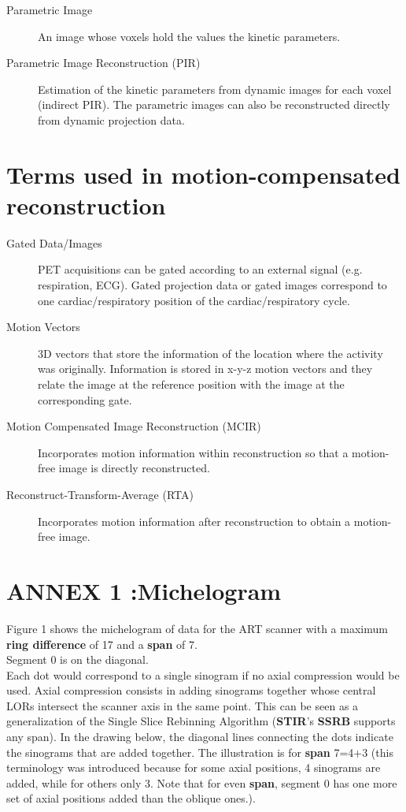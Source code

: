 \documentclass{article}
\begin{document}
\begin{description}
\item[Parametric Image]
An image whose voxels hold the values the kinetic parameters.

\item[Parametric Image Reconstruction (PIR)]
Estimation of the kinetic parameters from dynamic images for each voxel (indirect PIR). 
The parametric images can also be reconstructed directly from dynamic projection data. 
\end{description}

\section*{Terms used in motion-compensated reconstruction}

\begin{description}
\item[Gated Data/Images]
PET acquisitions can be gated according to an external signal (e.g. respiration, ECG). Gated projection data or gated images correspond to one cardiac/respiratory position of the cardiac/respiratory cycle. 


\item[Motion Vectors]
3D vectors that store the information of the location where the activity was originally. Information is stored in x-y-z motion vectors and they relate the image at the reference position with the image at the corresponding gate.


\item[Motion Compensated Image Reconstruction (MCIR)]
Incorporates motion information within reconstruction so that a motion-free image is directly reconstructed. 

\item[Reconstruct-Transform-Average (RTA)]
Incorporates motion information after reconstruction to obtain a motion-free image.
\end{description}

\newpage
 \section*{ ANNEX 1 :Michelogram}

Figure 1 shows the michelogram of data for the ART scanner with a maximum \textbf{ring 
difference} of 17 and a \textbf{span} of 7. \\
Segment 0 is on the diagonal. \\
Each dot would correspond to a single sinogram if no axial compression 
would be used. Axial compression consists in adding sinograms 
together whose central LORs intersect the scanner axis 
in the same point. This can be seen as a generalization of the 
Single Slice Rebinning Algorithm (\textbf{STIR}'s \textbf{SSRB} supports any span). 
In the drawing below, the diagonal 
lines connecting the dots indicate the sinograms that are added 
together. The illustration is for \textbf{span} 7=4+3 (this terminology 
was introduced because for some axial positions, 4 sinograms 
are added, while for others only 3. Note that for even \textbf{span}, segment 0
has one more set of axial positions added than the oblique ones.).
\end{document}
